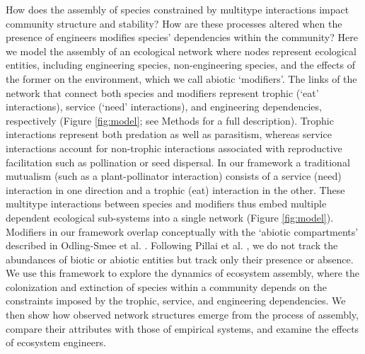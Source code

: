 \documentclass[twocolumn,preprintnumbers,amsmath,amssymb,superscriptaddress,linenumbers]{revtex4-1}
\begin{document}
How does the assembly of species constrained by multitype interactions impact community structure and stability?
How are these processes altered when the presence of engineers modifies species' dependencies within the community?
Here we model the assembly of an ecological network where nodes represent ecological entities, including engineering species, non-engineering species, and the effects of the former on the environment, which we call abiotic `modifiers'.
The links of the network that connect both species and modifiers represent trophic (`eat' interactions), service (`need' interactions), and engineering dependencies, respectively (Figure \ref{fig:model}; see Methods for a full description).
Trophic interactions represent both predation as well as parasitism, whereas service interactions account for non-trophic interactions associated with reproductive facilitation such as pollination or seed dispersal.
In our framework a traditional mutualism (such as a plant-pollinator interaction) consists of a service (need) interaction in one direction and a trophic (eat) interaction in the other.
These multitype interactions between species and modifiers thus embed multiple dependent ecological sub-systems into a single network (Figure \ref{fig:model}). %
Modifiers in our framework overlap conceptually with the `abiotic compartments' described in Odling-Smee et al. \cite{OdlingSmee2013}.
Following Pillai et al. \cite{Pillai2011}, we do not track the abundances of biotic or abiotic entities but track only their presence or absence.
We use this framework to explore the dynamics of ecosystem assembly, where the colonization and extinction of species within a community depends on the constraints imposed by the trophic, service, and engineering dependencies.
We then show how observed network structures emerge from the process of assembly, compare their attributes with those of empirical systems, and examine the effects of ecosystem engineers.
\end{document}
